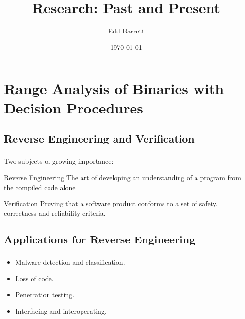 \documentclass[compress]{beamer}
\title{Research: Past and Present}
\author{Edd Barrett}
\date{\today}
\institute{%
	Software Development Team\\
	King's College London, England
}
\begin{document}
\begin{frame}
  \titlepage
\end{frame}

\section{Range Analysis of Binaries with Decision Procedures}

\begin{frame}
  \sectionpage
\end{frame}

\subsection{Reverse Engineering and Verification}

\begin{frame}[fragile]
	\frametitle{\insertsubsection}

	Two subjects of growing importance:
	\vfill
	\begin{block}{Reverse Engineering}
                The art of developing an understanding of a program from
                the compiled code alone
	\end{block}
	\vfill
	\begin{block}{Verification}
                Proving that a software product conforms to a set of
                safety, correctness and reliability criteria.
	\end{block}

\end{frame}


\subsection{Applications for Reverse Engineering}
\begin{frame}[fragile]
	\frametitle{\insertsubsection}

	\begin{itemize}
		\vfill
	\item Malware detection and classification.
		\vfill
	\item Loss of code.
		\vfill
	\item Penetration testing.
		\vfill
	\item Interfacing and interoperating.
		\vfill
	\end{itemize}

\end{frame}
\end{document}
